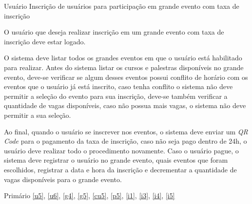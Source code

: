 
{Usuário}
{Inscrição de usuários para participação em grande evento com taxa de inscrição}
{O usuário que deseja realizar inscrição em um grande evento com taxa de inscrição deve estar logado.

O sistema deve listar todos os grandes eventos em que o usuário está habilitado para realizar. Antes do sistema listar os cursos e palestras disponíveis no grande evento, deve-se verificar se algum desses eventos possui conflito de horário com os eventos que o usuário já está inscrito, caso tenha conflito o sistema não deve permitir a seleção do evento para sua inscrição, deve-se também verificar a quantidade de vagas disponíveis, caso não possua mais vagas, o sistema não deve permitir a sua seleção. 

Ao final, quando o usuário se inscrever nos eventos, o sistema deve enviar um \textit{QR Code} para o pagamento da taxa de inscrição, caso não seja pago dentro de 24h, o usuário deve realizar todo o procedimento novamente. Caso o usuário pague, o sistema deve registrar o usuário no grande evento, quais eventos que foram escolhidos, registrar a data e hora da inscrição e decrementar a quantidade de vagas disponíveis para o grande evento.}
{Primário}
{\ref{u5}, \ref{u6}, \ref{g4}, \ref{g5}, \ref{cu5}, \ref{p5}, \ref{i1}, \ref{i3}, \ref{i4}, \ref{i5}}

